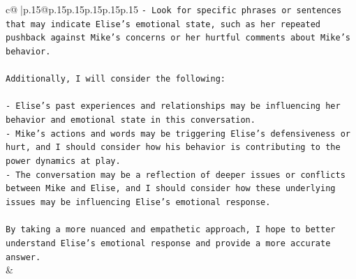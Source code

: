 \documentclass{article}
\begin{document}
{\begin{supertabular}{c@{$\;$}|p{.15\linewidth}@{}p{.15\linewidth}p{.15\linewidth}p{.15\linewidth}p{.15\linewidth}p{.15\linewidth}}
{{{\texttt{{-} Look for specific phrases or sentences that may indicate Elise's emotional state, such as her repeated pushback against Mike's concerns or her hurtful comments about Mike's behavior.} \\
\\ 
\texttt{Additionally, I will consider the following:} \\
\\ 
\texttt{{-} Elise's past experiences and relationships may be influencing her behavior and emotional state in this conversation.} \\
\texttt{{-} Mike's actions and words may be triggering Elise's defensiveness or hurt, and I should consider how his behavior is contributing to the power dynamics at play.} \\
\texttt{{-} The conversation may be a reflection of deeper issues or conflicts between Mike and Elise, and I should consider how these underlying issues may be influencing Elise's emotional response.} \\
\\ 
\texttt{By taking a more nuanced and empathetic approach, I hope to better understand Elise's emotional response and provide a more accurate answer.} \\
            }
        }
    }
    & \\ \\

\end{supertabular}
}
\end{document}
